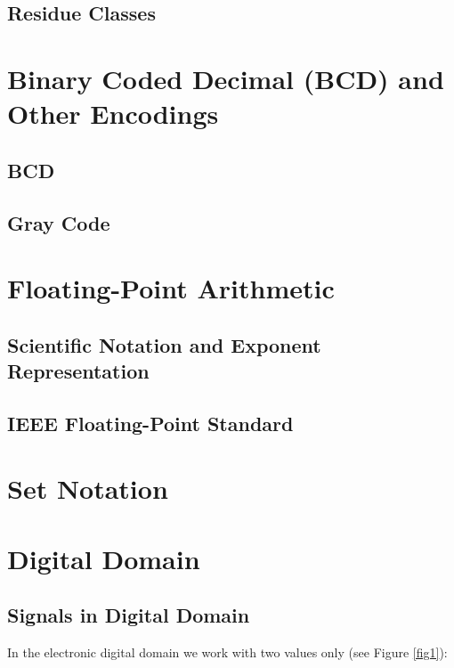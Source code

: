 \subsection{Residue Classes}
\lipsum[1]

\section{Binary Coded Decimal (BCD) and Other Encodings}
\lipsum[1]
\subsection{BCD}
\lipsum[1]
\subsection{Gray Code}
\lipsum[1]

\section{Floating-Point Arithmetic}
\lipsum[1]
\subsection{Scientific Notation and Exponent Representation}
\lipsum[1]
\subsection{IEEE Floating-Point Standard}
\lipsum[1]

\section{Set Notation}
\lipsum[1]

\section{Digital Domain}

\subsection{Signals in Digital Domain}

In the electronic digital domain we work with two values only (see Figure \ref{fig1}):


